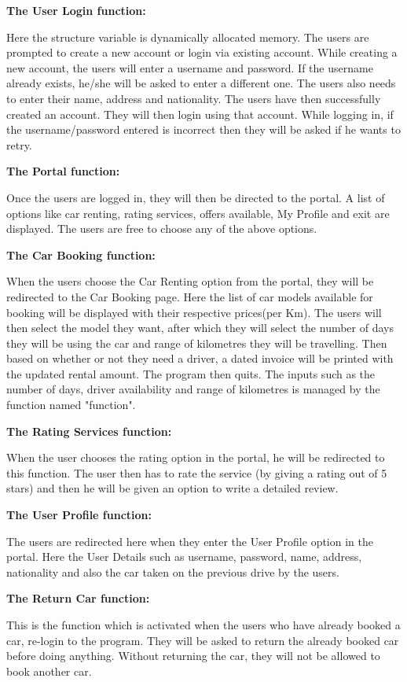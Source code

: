 \documentclass[12pt]{article}
\begin{document}
\noindent
\textbf{The User Login function:}
\par Here the structure variable is dynamically allocated memory. The users are prompted to create a new account or login via existing account. While creating a new account, the users will enter a username and password. If the username already exists, he/she will be asked to enter a different one. The users also needs to enter their name, address and nationality. The users have then successfully created an account. They will then login using that account. While logging in, if the username/password entered is incorrect then they will be asked if he wants to retry.

\noindent
\textbf{The Portal function:}
\par Once the users are logged in, they will then be directed to the portal. A list of options like car renting, rating services, offers available, My Profile and exit are displayed. The users are free to choose any of the above options.

\noindent
\textbf{The Car Booking function:}
\par When the users choose the Car Renting option from the portal, they will be redirected to the Car Booking page. Here the list of car models available for booking will be displayed with their respective prices(per Km). The users will then select the model they want, after which they will select the number of days they will be using the car and range of kilometres they will be travelling. Then based on whether or not they need a driver, a dated invoice will be printed with the updated rental amount. The program then quits. The inputs such as the number of days, driver availability and range of kilometres is managed by the function named "function".

\noindent
\textbf{The Rating Services function:}
\par When the user chooses the rating option in the portal, he will be redirected to this function. The user then has to rate the service (by giving a rating out of 5 stars) and then he will be given an option to write a detailed review.

\noindent
\textbf{The User Profile function:}
\par The users are redirected here when they enter the User Profile option in the portal. Here the User Details such as username, password, name, address, nationality and also the car taken on the previous drive by the users.

\noindent
\textbf{The Return Car function:}
\par This is the function which is activated when the users who have already booked a car, re-login to the program. They will be asked to return the already booked car before doing anything. Without returning the car, they will not be allowed to book another car.
\end{document}
